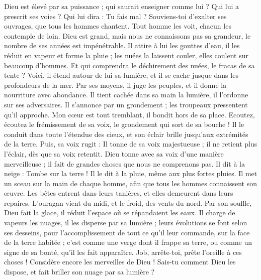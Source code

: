 \begin{multicols}{2}
Dieu est élevé par sa puissance ; qui saurait enseigner comme lui ?
Qui lui a prescrit ses voies ? Qui lui dira : Tu fais mal ?
Souviens-toi d'exalter ses ouvrages, que tous les hommes chantent.
Tout homme les voit, chacun les contemple de loin.
Dieu est grand, mais nous ne connaissons pas sa grandeur, le nombre de ses années est impénétrable.
Il attire à lui les gouttes d'eau, il les réduit en vapeur et forme la pluie ;
les nuées la laissent couler, elles coulent sur beaucoup d'hommes.
Et qui comprendra le déchirement des nuées, le fracas de sa tente ?
Voici, il étend autour de lui sa lumière, et il se cache jusque dans les profondeurs de la mer.
Par ses moyens, il juge les peuples, et il donne la nourriture avec abondance.
Il tient cachée dans sa main la lumière, il l'ordonne sur ses adversaires.
Il s'annonce par un grondement ; les troupeaux pressentent qu'il approche.
\VerseOne{}Mon cœur est tout tremblant, il bondit hors de sa place.
Ecoutez, écoutez le frémissement de sa voix, le grondement qui sort de sa bouche !
Il le conduit dans toute l'étendue des cieux, et son éclair brille jusqu'aux extrémités de la terre.
Puis, sa voix rugit : Il tonne de sa voix majestueuse ; il ne retient plus l'éclair, dès que sa voix retentit.
Dieu tonne avec sa voix d'une manière merveilleuse ; il fait de grandes choses que nous ne comprenons pas.
Il dit à la neige : Tombe sur la terre ! Il le dit à la pluie, même aux plus fortes pluies.
Il met un sceau sur la main de chaque homme, afin que tous les hommes connaissent son œuvre.
Les bêtes entrent dans leurs tanières, et elles demeurent dans leurs repaires.
L'ouragan vient du midi, et le froid, des vents du nord.
Par son souffle, Dieu fait la glace, il réduit l'espace où se répandaient les eaux.
Il charge de vapeurs les nuages, il les disperse par sa lumière ;
leurs évolutions se font selon ses desseins, pour l'accomplissement de tout ce qu'il leur commande, sur la face de la terre habitée ;
c'est comme une verge dont il frappe sa terre, ou comme un signe de sa bonté, qu'il les fait apparaître.
Job, arrête-toi, prête l'oreille à ces choses ! Considère encore les merveilles de Dieu !
Sais-tu comment Dieu les dispose, et fait briller son nuage par sa lumière ?

\end{multicols}
